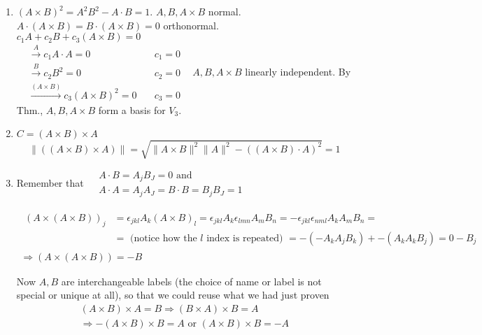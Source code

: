 \documentclass[twoside]{amsart}
\theoremstyle{plain}
\theoremstyle{definition}
\newcommand{\exercisehead}[1]
  {\smallskip
   \noindent{\small\bf Exercise #1.}}
\begin{document}
\exercisehead{7} 
\begin{enumerate}
\item $(A \times B)^2 = A^2 B^2 - A\cdot B =1$.  $A,B, A\times B$ normal.  \\
  $A \cdot (A\times B) = B\cdot (A\times B) = 0$ orthonormal.  \\
$c_1 A + c_2 B + c_3 (A\times B) =0$ \\
  $
\begin{aligned}
  & \xrightarrow{A} c_1 A \cdot A = 0 \quad & c_1 = 0 \\
  & \xrightarrow{B} c_2 B^2 = 0 \quad & c_2 = 0 \\
  & \xrightarrow{(A\times B)} c_3 (A\times B)^2 = 0 \quad & c_3  = 0 
\end{aligned}
$ \quad \, $A,B, A\times B$ linearly independent.  By Thm., $A,B, A\times B$ form a basis for $V_3$.  
\item $C = (A\times B)\times A$ \\
  \[
\| ((A\times B) \times A) \| = \sqrt{ \| A \times B\|^2 \| A \|^2 - ((A \times B) \cdot A)^2 } = 1 
\]
\item Remember that $
  \begin{aligned}
    & A\cdot B = A_j B_J = 0 \text{ and } \\
    & A\cdot A = A_j A_J = B\cdot B = B_j B_J = 1
\end{aligned}$ 

\[
\begin{gathered}
\begin{aligned}
  (A \times (A \times B) )_j & = \epsilon_{jkl}A_k (A\times B)_l  = \epsilon_{jkl} A_k \epsilon_{lmn} A_m B_n = -\epsilon_{jkl} \epsilon_{nml} A_k A_m B_n =  \\
  & = \text{ (notice how the $l$ index is repeated) } = -(-A_k A_j B_k) + - (A_k A_k B_j) = 0 - B_j
\end{aligned} \\
\Longrightarrow (A \times (A \times B)) = -B
\end{gathered}
\]

Now $A,B$ are interchangeable labels (the choice of name or label is not special or unique at all), so that we could reuse what we had just proven 
\[
\begin{gathered}
  (A\times B) \times A = B \Longrightarrow (B\times A) \times B = A \\
  \Longrightarrow -(A \times B) \times B = A \text{ or } (A\times B) \times B = -A
\end{gathered}
\]
\end{enumerate}
\end{document}
